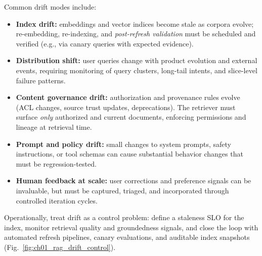 Common drift modes include:
\begin{itemize}
  \item \textbf{Index drift:} embeddings and vector indices become stale as corpora evolve; re-embedding,
  re-indexing, and \emph{post-refresh validation} must be scheduled and verified (e.g., via canary queries
  with expected evidence).
  \item \textbf{Distribution shift:} user queries change with product evolution and external events,
  requiring monitoring of query clusters, long-tail intents, and slice-level failure patterns.
  \item \textbf{Content governance drift:} authorization and provenance rules evolve (ACL changes,
  source trust updates, deprecations). The retriever must surface \emph{only} authorized and current documents,
  enforcing permissions and lineage at retrieval time.
  \item \textbf{Prompt and policy drift:} small changes to system prompts, safety instructions, or tool schemas
  can cause substantial behavior changes that must be regression-tested.
  \item \textbf{Human feedback at scale:} user corrections and preference signals can be invaluable, but must
  be captured, triaged, and incorporated through controlled iteration cycles.
\end{itemize}

Operationally, treat drift as a control problem: define a staleness SLO for the index,
monitor retrieval quality and groundedness signals, and close the loop with automated refresh pipelines,
canary evaluations, and auditable index snapshots (Fig.~\ref{fig:ch01_rag_drift_control}).

